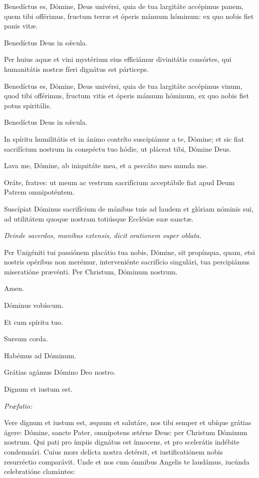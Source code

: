 Benedíctus es, Dómine, Deus univérsi, quia de tua largitáte accépimus panem, quem tibi offérimus, fructum terræ et óperis mánuum hóminum: ex quo nobis fiet panis vitæ.

\Rbardot{} Benedíctus Deus in sǽcula.

Per huius aquæ et vini mystérium eius efficiámur divinitátis consórtes, qui humanitátis nostræ fíeri dignátus est párticeps.

Benedíctus es, Dómine, Deus univérsi, quia de tua largitáte accépimus vinum, quod tibi offérimus, fructum vitis et óperis mánuum hóminum, ex quo nobis fiet potus spiritális.

\Rbardot{} Benedíctus Deus in sǽcula.

In spíritu humilitátis et in ánimo contríto suscipiámur a te, Dómine; et sic fiat sacrifícium nostrum in conspéctu tuo hódie, ut pláceat tibi, Dómine Deus.

Lava me, Dómine, ab iniquitáte mea, et a peccáto meo munda me.

Oráte, fratres: ut meum ac vestrum sacrifícium acceptábile fiat apud Deum Patrem omnipoténtem.

\Rbardot{} Suscípiat Dóminus sacrifícium de mánibus tuis ad laudem et glóriam nóminis sui, ad utilitátem quoque nostram totiúsque Ecclésiæ suæ sanctæ.

\textit{Deinde sacerdos, manibus extensis, dicit orationem super oblata.}

Per Unigéniti tui passiónem placátio tua nobis, Dómine, sit propínqua, quam, etsi nostris opéribus non merémur, interveniénte sacrifício singulári, tua percipiámus miseratióne prævénti. Per Christum, Dóminum nostrum.

\Rbardot{} Amen.

\Vbardot{} Dóminus vobíscum.

\Rbardot{} Et cum spíritu tuo.

\Vbardot{} Sursum corda.

\Rbardot{} Habémus ad Dóminum.

\Vbardot{} Grátias agámus Dómino Deo nostro.

\Rbardot{} Dignum et iustum est.

\textit{Præfatio:}

Vere dignum et iustum est, æquum et salutáre, nos tibi semper et ubíque grátias ágere: Dómine, sancte Pater, omnípotens ætérne Deus: per Christum Dóminum nostrum. Qui pati pro ímpiis dignátus est ínnocens, et pro scelerátis indébite condemnári. Cuius mors delícta nostra detérsit, et iustificatiónem nobis resurréctio comparávit. Unde et nos cum ómnibus Angelis te laudámus, iucúnda celebratióne clamántes:

